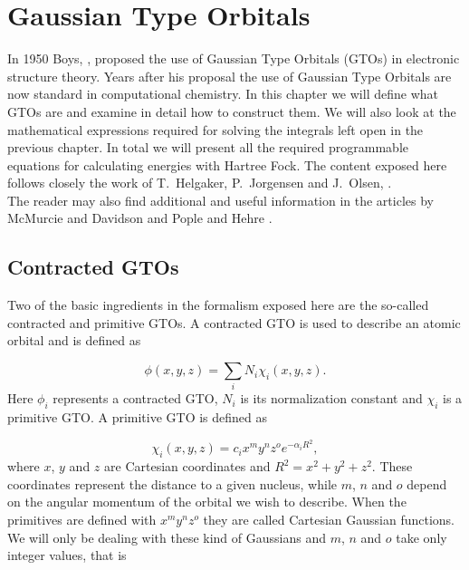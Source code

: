 \documentclass[a4paper,norsk,11pt,twoside]{report}
\begin{document}
\chapter{Gaussian Type Orbitals}

In 1950 Boys, \cite{boys_original_work_stuff}, proposed the use of
Gaussian Type Orbitals (GTOs) in electronic structure theory. Years
after his proposal the use of  Gaussian Type Orbitals are
now standard in computational chemistry. In this chapter we will
define what GTOs are and examine in detail how to construct them. We
will also look at the mathematical expressions required for solving
the integrals left open in the previous chapter. In total we will
present all the required programmable equations for calculating
energies with Hartree Fock. The content exposed here follows closely the work of
T.~Helgaker, P.~Jorgensen and J.~Olsen, \cite{helg1,helg2,helg3}. \\

The reader may also find additional and useful information in the 
articles by McMurcie and Davidson \cite{helg4} and Pople and Hehre \cite{helg5}.

\section{Contracted GTOs}
Two  of the  basic ingredients in the formalism exposed here are the  so-called contracted and primitive GTOs. 
A contracted GTO is used to describe an atomic orbital and is defined as

\begin{equation}
\phi(x,y,z) = \sum_{i} N_i \chi_i(x,y,z) . \label{GTO_EQUATION}
\end{equation}
Here $\phi_i$ represents a contracted GTO, $N_i$ is its normalization constant and $\chi_i$ is a primitive GTO. A primitive GTO is defined as

\begin{equation}
\chi_i(x,y,z) = c_i x^m y^n z^o e^{-\alpha_i R^2} , \label{primitivegto}
\end{equation}
where $x$, $y$ and $z$ are Cartesian coordinates and $R^2 = x^2 + y^2
+ z^2$. These coordinates represent the distance to a given nucleus, while  $m$, $n$
and $o$ depend on the angular momentum of the orbital we wish to
describe. When the primitives are defined with $x^m y^n z^o$ they are
 called Cartesian Gaussian functions. We will only be dealing
with these kind of Gaussians and $m$, $n$ and $o$ take only integer values, that is
\end{document}
